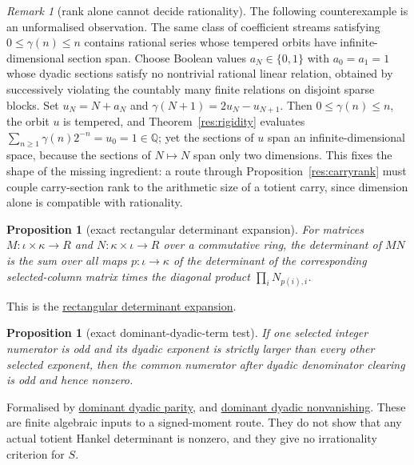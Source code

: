 \documentclass[11pt]{article}
\newcommand{\commit}{312b96c0d149ed466725c62d4ef24cfc91bca34e}
\newcommand{\repobase}{https://github.com/wcook04/plectis-lean-erdos249-257/blob/\commit}
\newcommand{\PK}{Erdos249257}
\newcommand{\lword}[4]{\href{\repobase/\PK/#1\#L#2}{#4}}
\newtheorem{proposition}[theorem]{Proposition}
\theoremstyle{definition}
\theoremstyle{remark}
\newtheorem*{remark}{Remark}
\newcommand{\Q}{\mathbb{Q}}
\begin{document}
{\begin{remark}[rank alone cannot decide rationality]
The following counterexample is an unformalised observation.  The same class
of coefficient streams satisfying $0\leq\gamma(n)\leq n$ contains rational
series whose tempered orbits have
infinite-dimensional section span.  Choose Boolean values
\(a_N\in\{0,1\}\) with \(a_0=a_1=1\) whose dyadic sections satisfy no
nontrivial rational linear relation, obtained by successively violating the
countably many finite relations on disjoint sparse blocks.  Set
\(u_N=N+a_N\) and \(\gamma(N+1)=2u_N-u_{N+1}\).  Then
\(0\le\gamma(n)\le n\), the orbit \(u\) is tempered, and
Theorem~\ref{res:rigidity} evaluates
\(\sum_{n\ge1}\gamma(n)2^{-n}=u_0=1\in\Q\); yet the sections of \(u\) span
an infinite-dimensional space, because the sections of \(N\mapsto N\) span
only two dimensions.  This fixes the shape of the missing ingredient: a route through
Proposition~\ref{res:carryrank} must couple carry-section rank to the
arithmetic size of a totient carry, since dimension alone is compatible
with rationality.
\end{remark}

\begin{proposition}[exact rectangular determinant expansion]\label{res:signedmoment}
For matrices $M:\iota\times\kappa\to R$ and
$N:\kappa\times\iota\to R$ over a commutative ring, the determinant of
$MN$ is the sum over all maps $p:\iota\to\kappa$ of the determinant of the
corresponding selected-column matrix times the diagonal product
$\prod_i N_{p(i),i}$.
\end{proposition}
\noindent This is the
\lword{SignedQMomentObstruction.lean}{29}{det_mul_rectangular}{rectangular determinant expansion}.

\begin{proposition}[exact dominant-dyadic-term test]\label{res:dominantdyadic}
If one selected integer numerator is odd and its dyadic exponent is strictly
larger than every other selected exponent, then the common numerator after
dyadic denominator clearing is odd and hence nonzero.
\end{proposition}
\noindent Formalised by
\lword{SignedQMomentObstruction.lean}{78}{scaled_dyadic_sum_odd}{dominant dyadic parity}, and
\lword{SignedQMomentObstruction.lean}{96}{scaled_dyadic_sum_ne_zero}{dominant dyadic nonvanishing}.
These are finite algebraic inputs to a signed-moment route.  They do not show
that any actual totient Hankel determinant is nonzero, and they give no
irrationality criterion for $S$.

}
\end{document}
